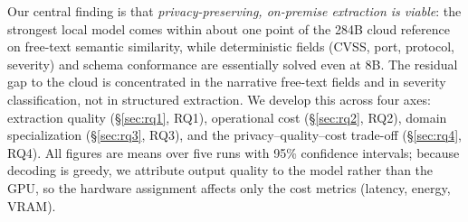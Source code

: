 Our central finding is that \emph{privacy-preserving, on-premise extraction is viable}: the strongest local model comes within about one point of the 284B cloud reference on free-text semantic similarity, while deterministic fields (CVSS, port, protocol, severity) and schema conformance are essentially solved even at 8B. The residual gap to the cloud is concentrated in the narrative free-text fields and in severity classification, not in structured extraction. We develop this across four axes: extraction quality (\S\ref{sec:rq1}, RQ1), operational cost (\S\ref{sec:rq2}, RQ2), domain specialization (\S\ref{sec:rq3}, RQ3), and the privacy--quality--cost trade-off (\S\ref{sec:rq4}, RQ4). All figures are means over five runs with 95\% confidence intervals; because decoding is greedy, we attribute output quality to the model rather than the GPU, so the hardware assignment affects only the cost metrics (latency, energy, VRAM).

